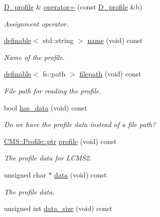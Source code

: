 \begin{DoxyCompactItemize}
\hyperlink{class_photo_finish_1_1_d__profile}{D\+\_\+profile} \& \hyperlink{class_photo_finish_1_1_d__profile_a04192b431fefe553190e96e74fd00600}{operator=} (const \hyperlink{class_photo_finish_1_1_d__profile}{D\+\_\+profile} \&b)
\begin{DoxyCompactList}\small\item\em Assignment operator. \end{DoxyCompactList}\item 
\hyperlink{class_photo_finish_1_1definable}{definable}$<$ std\+::string $>$ \hyperlink{class_photo_finish_1_1_d__profile_a7fd0fdc344ac49bb1bea312ef63f554c}{name} (void) const
\begin{DoxyCompactList}\small\item\em Name of the profile. \end{DoxyCompactList}\item 
\hyperlink{class_photo_finish_1_1definable}{definable}$<$ fs\+::path $>$ \hyperlink{class_photo_finish_1_1_d__profile_aeacae9a94f4ecc6dabc4810a86e642fc}{filepath} (void) const
\begin{DoxyCompactList}\small\item\em File path for reading the profile. \end{DoxyCompactList}\item 
bool \hyperlink{class_photo_finish_1_1_d__profile_a2388aa76121bd35450fbd0e112567894}{has\+\_\+data} (void) const
\begin{DoxyCompactList}\small\item\em Do we have the profile data instead of a file path? \end{DoxyCompactList}\item 
\hyperlink{class_c_m_s_1_1_profile_a7d5a80e1317d17dbfdf5ae69820ab08b}{C\+M\+S\+::\+Profile\+::ptr} \hyperlink{class_photo_finish_1_1_d__profile_ac8d5a87286d5c01f54401d200b1c96bf}{profile} (void) const
\begin{DoxyCompactList}\small\item\em The profile data for L\+C\+M\+S2. \end{DoxyCompactList}\item 
unsigned char $\ast$ \hyperlink{class_photo_finish_1_1_d__profile_ab791e89b8333a60a13cdbb1b9579291c}{data} (void) const
\begin{DoxyCompactList}\small\item\em The profile data. \end{DoxyCompactList}\item 
unsigned int \hyperlink{class_photo_finish_1_1_d__profile_ab0907773b818b9d19c47e5aa4558b476}{data\+\_\+size} (void) const

\end{DoxyCompactItemize}
